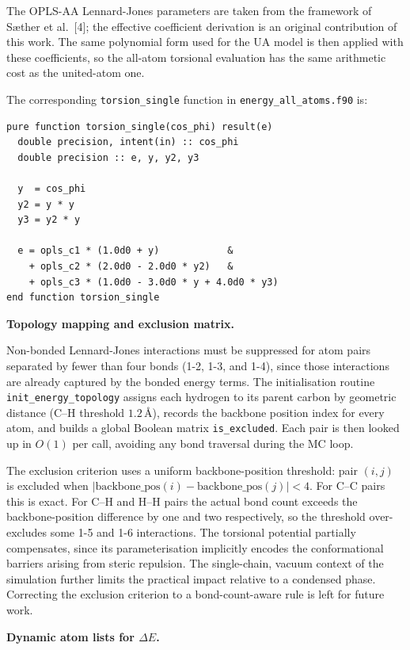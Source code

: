 The OPLS-AA Lennard-Jones parameters are taken from the framework of
Sæther et al.~[4]; the effective coefficient derivation is an original
contribution of this work. The same polynomial form used for the UA
model is then applied with these coefficients, so the all-atom
torsional evaluation has the same arithmetic cost as the united-atom one.

The corresponding \texttt{torsion\_single} function in
\texttt{energy\_all\_atoms.f90} is:

\begin{lstlisting}
pure function torsion_single(cos_phi) result(e)
  double precision, intent(in) :: cos_phi
  double precision :: e, y, y2, y3

  y  = cos_phi
  y2 = y * y
  y3 = y2 * y

  e = opls_c1 * (1.0d0 + y)            &
    + opls_c2 * (2.0d0 - 2.0d0 * y2)   &
    + opls_c3 * (1.0d0 - 3.0d0 * y + 4.0d0 * y3)
end function torsion_single
\end{lstlisting}

\textbf{Topology mapping and exclusion matrix.}

Non-bonded Lennard-Jones interactions must be suppressed for atom pairs
separated by fewer than four bonds (1-2, 1-3, and 1-4), since those
interactions are already captured by the bonded energy terms. The
initialisation routine \texttt{init\_energy\_topology} assigns each
hydrogen to its parent carbon by geometric distance (C--H threshold
$1.2\,\text{\AA}$), records the backbone position index for every atom,
and builds a global Boolean matrix \texttt{is\_excluded}. Each pair is
then looked up in $O(1)$ per call, avoiding any bond traversal during
the MC loop.

The exclusion criterion uses a uniform backbone-position threshold: pair
$(i,j)$ is excluded when
$|\text{backbone\_pos}(i) - \text{backbone\_pos}(j)| < 4$.
For C--C pairs this is exact. For C--H and H--H pairs the actual bond
count exceeds the backbone-position difference by one and two
respectively, so the threshold over-excludes some 1-5 and 1-6
interactions. The torsional potential partially compensates, since its
parameterisation implicitly encodes the conformational barriers arising
from steric repulsion. The single-chain, vacuum context of the
simulation further limits the practical impact relative to a condensed
phase. Correcting the exclusion criterion to a bond-count-aware rule is
left for future work.

\textbf{Dynamic atom lists for $\Delta E$.}

